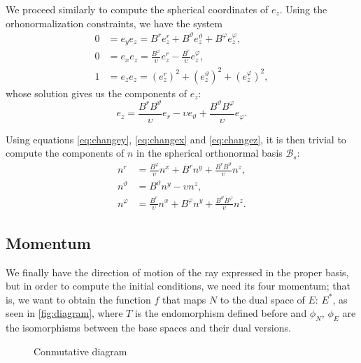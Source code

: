 We proceed similarly to compute the spherical coordinates of $e_z$. Using the orhonormalization constraints, we have the system
\begin{align*}
	0 &= e_y e_z = B^r e_z^r + B^\vartheta e_z^\vartheta + B^\varphi e_z^\varphi, \\
	0 &= e_x e_z = \frac{B^\varphi}{\upsilon} e_z^r - \frac{B^r}{\upsilon} e_z^\varphi, \\
	1 &= e_z e_z = \left(e_z^r\right)^2 + \left(e_z^\vartheta\right)^2 + \left(e_z^\varphi\right)^2,
\end{align*}
whose solution gives us the components of $e_z$:
\begin{equation}
	\label{eq:changez}
	e_z = \frac{B^r B^\vartheta}{\upsilon} e_r - \upsilon e_\vartheta + \frac{B^\vartheta B^\varphi}{\upsilon} e_\varphi.
\end{equation}

Using equations \ref{eq:changey}, \ref{eq:changex} and \ref{eq:changez}, it is then trivial to compute the components of $n$ in the spherical orthonormal basis $\mathcal{B}_s$:
\begin{align}
	n^r &= \frac{B^\varphi}{\upsilon} n^x + B^r n^y + \frac{B^r B^\vartheta}{\upsilon} n^z, \\
	n^\vartheta &= B^\vartheta n^y - \upsilon n^z, \\
	n^\varphi &= \frac{B^r}{\upsilon} n^x + B^\varphi n^y + \frac{B^\vartheta B^\varphi}{\upsilon} n^z.
\end{align}

\subsection{Momentum}

We finally have the direction of motion of the ray expressed in the proper basis, but in order to compute the initial conditions, we need its four momentum; that is, we want to obtain the function $f$ that maps $N$ to the dual space of $E$: $E^*$, as seen in \autoref{fig:diagram}, where $T$ is the endomorphism defined before and $\phi_N$, $\phi_E$ are the isomorphisms between the base spaces and their dual versions.

\begin{figure}[bth]
	\myfloatalign
	\caption[Conmutative diagram]{Conmutative diagram}
	\label{fig:diagram}
\end{figure}

